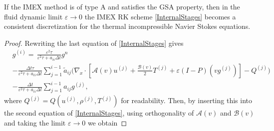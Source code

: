 \documentclass[final,11pt]{siamart251216}
\numberwithin{equation}{section}
\theoremstyle{definition}
\theoremstyle{remark}
\begin{document}
\begin{theorem}\label{ThmFullBGKTypeA}
	If the IMEX method is of type A and satisfies the GSA property, then in the fluid dynamic limit $\varepsilon \rightarrow 0$ the IMEX RK scheme \eqref{InternalStages} becomes a consistent discretization for the thermal  incompressible Navier Stokes equations.
\end{theorem}
\begin{proof}
Rewriting the last equation of \eqref{InternalStages} gives
\begin{align}
	\label{InternalStagesForg}
&g^{(i)} = \, \frac{\varepsilon^2 \tau}{\varepsilon^2 \tau + a_{ii} \Delta t} g^n \nonumber \\
&- \frac{\Delta t \tau}{\varepsilon^2 \tau + a_{ii} \Delta t} \sum_{j=1}^{i-1} \tilde{a}_{ij} \Biggl( \nabla_x \cdot \left[ \mathcal{A}(v) u^{(j)} + \frac{\mathcal{B}(v)}{2} T^{(j)} + \varepsilon (I-P)(vg^{(j)}) \right] - Q^{(j)} \Biggr) \\
&- \frac{\Delta t}{\varepsilon^2 \tau + a_{ii} \Delta t} \sum_{j=1}^{i-1} a_{ij} g^{(j)},\nonumber
\end{align}
where $Q^{(j)} = Q(u^{(j)},\rho^{(j)},T^{(j)})$ for readability. Then, by inserting  this %
into the second equation of \eqref{InternalStages}, using orthogonality of $\mathcal{A}(v)$ and $\mathcal{B}(v)$  and taking the limit $\varepsilon \to 0$ we obtain

\end{proof}
\end{document}
